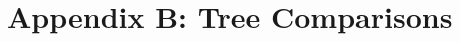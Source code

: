\documentclass[12pt,letterpaper]{article}
\begin{document}
\section{Appendix B: Tree Comparisons}

\end{document}
